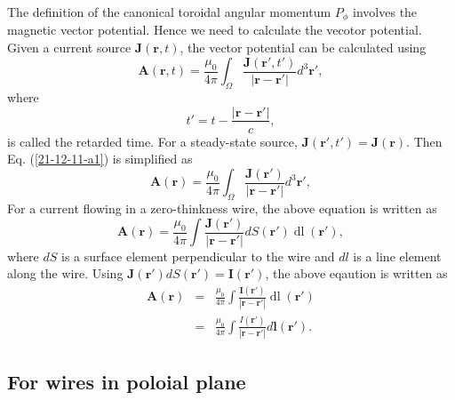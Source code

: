 \documentclass{llncs}
\newcommand{\tmop}[1]{\ensuremath{\operatorname{#1}}}
\begin{document}
The definition of the canonical toroidal angular momentum $P_{\phi}$ involves
the magnetic vector potential. Hence we need to calculate the vecotor
potential. Given a current source $\mathbf{J} (\mathbf{r}, t)$, the vector
potential can be calculated using
\begin{equation}
  \label{21-12-11-a1} \mathbf{A} (\mathbf{r}, t) = \frac{\mu_0}{4 \pi}
  \int_{\Omega} \frac{\mathbf{J} (\mathbf{r}', t')}{| \mathbf{r}-\mathbf{r}'
  |} d^3 \mathbf{r}',
\end{equation}
where
\begin{equation}
  t' = t - \frac{| \mathbf{r}-\mathbf{r}' |}{c},
\end{equation}
is called the retarded time. For a steady-state source, $\mathbf{J}
(\mathbf{r}', t') =\mathbf{J} (\mathbf{r})$. Then Eq. (\ref{21-12-11-a1}) is
simplified as
\begin{equation}
  \mathbf{A} (\mathbf{r}) = \frac{\mu_0}{4 \pi} \int_{\Omega} \frac{\mathbf{J}
  (\mathbf{r}')}{| \mathbf{r}-\mathbf{r}' |} d^3 \mathbf{r}',
\end{equation}
For a current flowing in a zero-thinkness wire, the above equation is written
as
\begin{equation}
  \mathbf{A} (\mathbf{r}) = \frac{\mu_0}{4 \pi} \int \frac{\mathbf{J}
  (\mathbf{r}')}{| \mathbf{r}-\mathbf{r}' |} d S (\mathbf{r}') \tmop{dl}
  (\mathbf{r}'),
\end{equation}
where $d S$ is a surface element perpendicular to the wire and $d l$ is a line
element along the wire. Using $\mathbf{J} (\mathbf{r}') d S (\mathbf{r}')
=\mathbf{I} (\mathbf{r}')$, the above eqaution is written as
\begin{eqnarray}
  \mathbf{A} (\mathbf{r}) & = & \frac{\mu_0}{4 \pi} \int \frac{\mathbf{I}
  (\mathbf{r}')}{| \mathbf{r}-\mathbf{r}' |} \tmop{dl} (\mathbf{r}')
  \nonumber\\
  & = & \frac{\mu_0}{4 \pi} \int \frac{I (\mathbf{r}')}{|
  \mathbf{r}-\mathbf{r}' |} d\mathbf{l} (\mathbf{r}') . 
\end{eqnarray}

\subsection{For wires in poloial plane}
\end{document}
